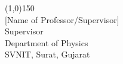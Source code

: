 \vspace{50pt}


\begin{multicols}{2}
    \begin{center}
        \line(1,0){150}\\
        {[Name of Professor/Supervisor]} \\ 
        {Supervisor}\\ 
        {Department of Physics} \\ 
        {SVNIT, Surat, Gujarat}
    \end{center}
    
    \columnbreak

    \begin{center}
    \end{center}

\end{multicols}